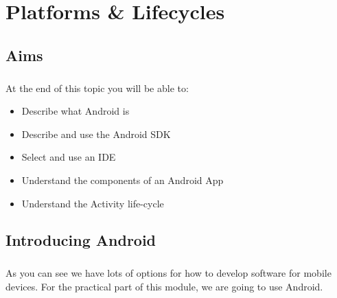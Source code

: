 \documentclass[12pt, a4paper, twoside]{book}
\begin{document}


\chapter{Platforms \& Lifecycles}

\section{Aims}
\paragraph{} At the end of this topic you will be able to:

\begin{itemize}
\item Describe what Android is
\item Describe and use the Android SDK
\item Select and use an IDE
\item Understand the components of an Android App
\item Understand the Activity life-cycle
\end{itemize}

\section{Introducing Android} 
\paragraph{} As you can see we have lots of options for how to develop software for mobile devices. For the practical part of this module, we are going to use Android.
\end{document}
